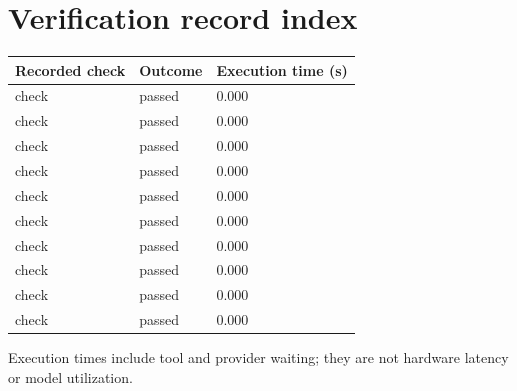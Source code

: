 \documentclass[11pt,a4paper]{article}
\begin{document}
\section{Verification record index}

{\small\renewcommand{\arraystretch}{1.18}\begin{longtable}{@{}L{0.57\textwidth}|L{0.16\textwidth}|L{0.17\textwidth}@{}}\toprule

\textbf{Recorded check} & \textbf{Outcome} & \textbf{Execution time (\allowbreak{}s)\allowbreak{}}\\\midrule\endhead

check & passed & 0.000\\[2pt]\hline

check & passed & 0.000\\[2pt]\hline

check & passed & 0.000\\[2pt]\hline

check & passed & 0.000\\[2pt]\hline

check & passed & 0.000\\[2pt]\hline

check & passed & 0.000\\[2pt]\hline

check & passed & 0.000\\[2pt]\hline

check & passed & 0.000\\[2pt]\hline

check & passed & 0.000\\[2pt]\hline

check & passed & 0.000\\[2pt]\hline

\bottomrule\end{longtable}}

Execution times include tool and provider waiting; they are not hardware latency or model utilization.
\end{document}
